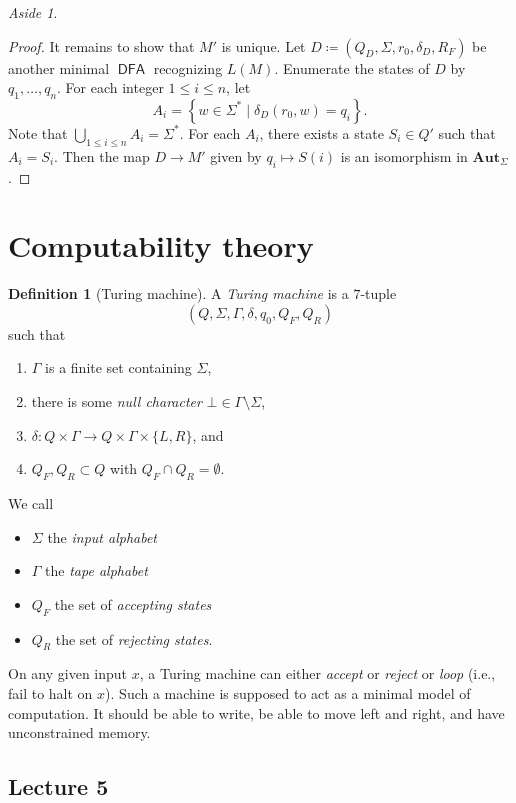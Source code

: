 \documentclass[10pt,letterpaper,cm]{nupset}
\theoremstyle{definition}
\newtheorem{definition}{Definition}[subsection]
\theoremstyle{theorem}
\theoremstyle{remark}
\newtheorem*{aside}{Aside}
\newcommand{\1}{\mathbf{1}}
\newcommand{\0}{\vec 0}
\DeclareMathOperator{\DFA}{\mathsf{DFA}}
\begin{document}
\begin{aside}
\begin{proof}
It remains to show that $M'$ is unique. Let $D\coloneqq \left(Q_D, \Sigma, r_0, \delta_D, R_F\right)$ be another minimal $\DFA$ recognizing $L(M)$. Enumerate the states of $D$ by $q_1, \ldots, q_n$. For each integer $1\leq i \leq n$, let $$A_i = \left\{w\in \Sigma^{\ast} \mid \delta_D(r_0, w) =q_i  \right\}.$$ Note that $\bigcup_{1\leq i \leq n}A_i = \Sigma^{\ast}$. For each $A_i$, there exists a state $S_i \in Q'$ such that $A_i = S_i$. Then the map $D \to M'$ given by $q_i \mapsto S(i)$ is an isomorphism in $\mathbf{Aut}_{\Sigma}$.
\end{proof}
\end{aside}

\section{Computability theory}

\begin{definition}[Turing machine]
A \textit{Turing machine} is a $7$-tuple $$\left(Q, \Sigma, \Gamma, \delta, q_0, Q_F, Q_R\right)$$ such that
\begin{enumerate}[label=(\roman*)]
\item $\Gamma$ is a finite set containing $\Sigma$, 
\item there is some \textit{null character} $\bot \in \Gamma \setminus \Sigma$,
\item $\delta : Q\times \Gamma \to Q \times \Gamma \times \{L, R\}$, and 
\item $Q_F, Q_R \subset Q$ with $Q_F \cap Q_R = \emptyset$. 
\end{enumerate}
We call 
\begin{itemize}
\item $\Sigma$ the \textit{input alphabet} 
\item $\Gamma$ the \textit{tape alphabet}
\item $Q_F$ the set of \textit{accepting states} 
\item $Q_R$ the set of \textit{rejecting states}.
\end{itemize}
\end{definition}


On any given input $x$, a Turing machine can either \textit{accept} or \textit{reject} or \textit{loop} (i.e., fail to halt on $x$).
Such a machine is supposed to act as a minimal model of computation. It should be able to write, be able to move left and right, and have unconstrained memory.


\subsection{Lecture 5}
\end{document}
